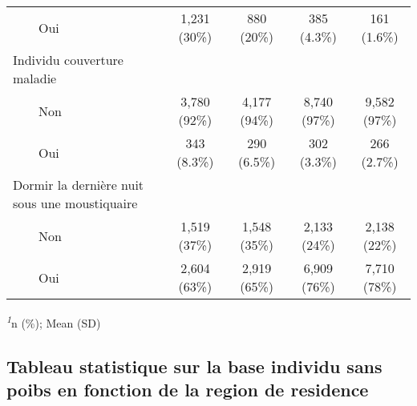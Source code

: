 \documentclass[
]{article}
\begin{document}
\begin{table}[!t]
\begin{tabular*}{\linewidth}{@{\extracolsep{\fill}}lcccc}
    Oui & 1,231 (30\%) & 880 (20\%) & 385 (4.3\%) & 161 (1.6\%) \\ 
Individu couverture maladie &  &  &  &  \\ 
    Non & 3,780 (92\%) & 4,177 (94\%) & 8,740 (97\%) & 9,582 (97\%) \\ 
    Oui & 343 (8.3\%) & 290 (6.5\%) & 302 (3.3\%) & 266 (2.7\%) \\ 
Dormir la dernière nuit sous une moustiquaire &  &  &  &  \\ 
    Non & 1,519 (37\%) & 1,548 (35\%) & 2,133 (24\%) & 2,138 (22\%) \\ 
    Oui & 2,604 (63\%) & 2,919 (65\%) & 6,909 (76\%) & 7,710 (78\%) \\ 
\bottomrule
\end{tabular*}
\begin{minipage}{\linewidth}
\textsuperscript{\textit{1}}n (\%); Mean (SD)\\
\end{minipage}
\end{table}

\subsection{Tableau statistique sur la base individu sans poibs en
fonction de la region de
residence}\label{tableau-statistique-sur-la-base-individu-sans-poibs-en-fonction-de-la-region-de-residence}
\end{document}
